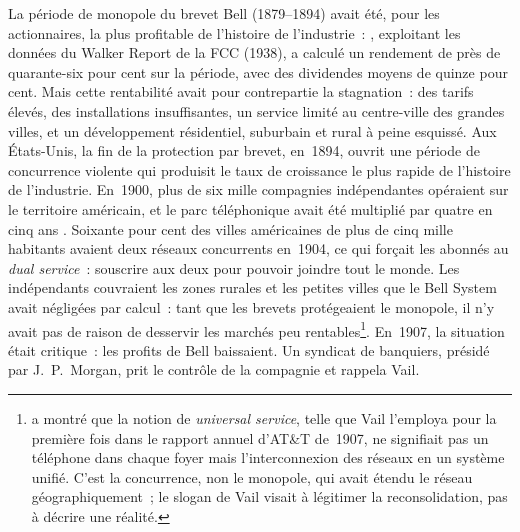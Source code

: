 %
La période de monopole du brevet Bell (1879--1894) avait été, pour les actionnaires, la plus profitable de l'histoire de l'industrie~: \textcite{gabel_early_1969}, exploitant les données du Walker Report de la FCC (1938), a calculé un rendement de près de quarante-six pour cent sur la période, avec des dividendes moyens de quinze pour cent. Mais cette rentabilité avait pour contrepartie la stagnation~: des tarifs élevés, des installations insuffisantes, un service limité au centre-ville des grandes villes, et un développement résidentiel, suburbain et rural à peine esquissé. Aux États-Unis, la fin de la protection par brevet, en~1894, ouvrit une période de concurrence violente qui produisit le taux de croissance le plus rapide de l'histoire de l'industrie. En~1900, plus de six mille compagnies indépendantes opéraient sur le territoire américain, et le parc téléphonique avait été multiplié par quatre en cinq ans \parencite{mueller_universal_1993}. Soixante pour cent des villes américaines de plus de cinq mille habitants avaient deux réseaux concurrents en~1904, ce qui forçait les abonnés au \og \emph{dual service}\fg{}~: souscrire aux deux pour pouvoir joindre tout le monde. Les indépendants couvraient les zones rurales et les petites villes que le Bell System avait négligées par calcul~: tant que les brevets protégeaient le monopole, il n'y avait pas de raison de desservir les marchés peu rentables\footnote{\textcite{mueller_universal_1993} a montré que la notion de \og \emph{universal service}\fg{}, telle que Vail l'employa pour la première fois dans le rapport annuel d'AT\&T de~1907, ne signifiait pas un téléphone dans chaque foyer mais l'interconnexion des réseaux en un système unifié. C'est la concurrence, non le monopole, qui avait étendu le réseau géographiquement~; le slogan de Vail visait à légitimer la reconsolidation, pas à décrire une réalité.}. En~1907, la situation était critique~: les profits de Bell baissaient. Un syndicat de banquiers, présidé par J.~P.~Morgan, prit le contrôle de la compagnie et rappela Vail.

